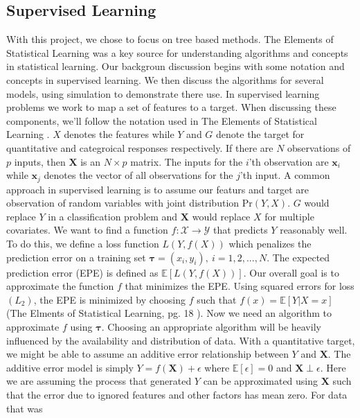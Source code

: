 \documentclass[
  12pt,
  letterpaper,
  DIV=11,
  numbers=noendperiod]{scrartcl}
\newcommand{\bm}{\mathbf}
\begin{document}
\subsection{Supervised Learning}\label{supervised-learning}

With this project, we chose to focus on tree based methods. The Elements
of Statistical Learning \citep{esl} was a key source for understanding
algorithms and concepts in statistical learning. Our backgroun
discussion begins with some notation and concepts in supervised
learning. We then discuss the algorithms for several models, using
simulation to demonstrate there use. In supervised learning problems we
work to map a set of features to a target. When discussing these
components, we'll follow the notation used in The Elements of
Statistical Learning \citep{esl}. \(X\) denotes the features while \(Y\)
and \(G\) denote the target for quantitative and categroical responses
respectively. If there are \(N\) observations of \(p\) inputs, then
\(\bm X\) is an \(N\times p\) matrix. The inputs for the \(i\)'th
observation are \(\bm x_i\) while \(\bm x_j\) denotes the vector of all
observations for the \(j\)'th input. A common approach in supervised
learning is to assume our featurs and target are observation of random
variables with joint distribution \(\text{Pr}(Y,X)\). \(G\) would
replace \(Y\) in a classification problem and \(\bm X\) would replace
\(X\) for multiple covariates. We want to find a function
\(f:\mathcal{X}\rightarrow\mathcal{Y}\) that predicts \(Y\) reasonably
well. To do this, we define a loss function \(L(Y,f(X))\) which
penalizes the prediction error on a training set
\(\bm \tau=(x_i,y_i),\ i=1,2,...,N\). The expected prediction error
(EPE) is defined as \(\mathbb{E}[L(Y,f(X))]\). Our overall goal is to
approximate the function \(f\) that minimizes the EPE. Using squared
errors for loss \((L_2)\), the EPE is minimized by choosing \(f\) such
that \(f(x)=\mathbb{E}[Y|X=x]\) (The Elments of Statistical Learning,
pg. 18 \citep{esl}). Now we need an algorithm to approximate \(f\) using
\(\bm \tau\). Choosing an appropriate algorithm will be heavily
influenced by the availability and distribution of data. With a
quantitative target, we might be able to assume an additive error
relationship between \(Y\) and \(\bm X\). The additive error model is
simply \(Y=f(\bm X)+\epsilon\) where \(\mathbb{E}[\epsilon]=0\) and
\(\bm X\perp\epsilon\). Here we are assuming the process that generated
\(Y\) can be approximated using \(\bm X\) such that the error due to
ignored features and other factors has mean zero. For data that was
\end{document}

